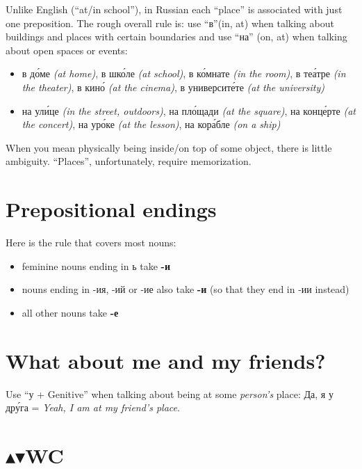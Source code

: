 Unlike English (``at/in school''), in Russian each ``place'' is
associated with just one preposition. The rough overall rule is: use
``в''(in, at) when talking about buildings and places with certain
boundaries and use ``на'' (on, at) when talking about open spaces or
events:

\begin{itemize}
\tightlist
\item
  в д\'{о}ме \emph{(at home)}, в шк\'{о}ле \emph{(at school)}, в к\'{о}мнате
  \emph{(in the room)}, в те\'{а}тре \emph{(in the theater)}, в кин\'{о}
  \emph{(at the cinema)}, в университ\'{е}те \emph{(at the university)}
\item
  на ул\'{и}це \emph{(in the street, outdoors)}, на пл\'{о}щади \emph{(at the
  square)}, на конц\'{е}рте \emph{(at the concert)}, на ур\'{о}ке \emph{(at the
  lesson)}, на кор\'{а}бле \emph{(on a ship)}
\end{itemize}

When you mean physically being inside/on top of some object, there is
little ambiguity. ``Places'', unfortunately, require memorization.

\section{Prepositional endings}\label{prepositional-endings}

Here is the rule that covers most nouns:

\begin{itemize}
\tightlist
\item
  feminine nouns ending in ь take \textbf{-и}
\item
  nouns ending in -ия, -ий or -ие also take \textbf{-и} (so that they
  end in -ии instead)
\item
  all other nouns take \textbf{-е}
\end{itemize}

\section{What about me and my
friends?}\label{what-about-me-and-my-friends}

Use ``у + Genitive'' when talking about being at some \emph{person's}
place: Да, я у др\'{у}га = \emph{Yeah, I am at my friend's place}.

\section{$ \blacktriangle$$ \blacktriangledown$WC}\label{wc}

